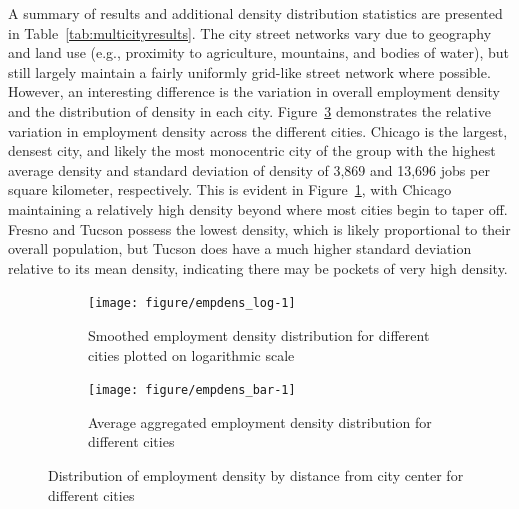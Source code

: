 \documentclass{elsarticle}\usepackage[]{graphicx}\usepackage[]{color}
\newenvironment{knitrout}{}{} %
\begin{document}
\pagebreak

A summary of results and additional density distribution statistics are presented in Table~\ref{tab:multicityresults}. The city street networks vary due to geography and land use (e.g., proximity to agriculture, mountains, and bodies of water), but still largely maintain a fairly uniformly grid-like street network where possible. However, an interesting difference is the variation in overall employment density and the distribution of density in each city. Figure~\ref{fig:empdens} demonstrates the relative variation in employment density across the different cities. Chicago is the largest, densest city, and likely the most monocentric city of the group with the highest average density and standard deviation of density of 3,869 and 13,696 jobs per square kilometer, respectively. This is evident in Figure~\ref{fig:empdens_log}, with Chicago maintaining a relatively high density beyond where most cities begin to taper off. Fresno and Tucson possess the lowest density, which is likely proportional to their overall population, but Tucson does have a much higher standard deviation relative to its mean density, indicating there may be pockets of very high density.

\begin{figure}[H]
     \centering
     \begin{subfigure}[b]{0.49\textwidth}
         \centering
\begin{knitrout}
\color{fgcolor}
\texttt{[image: figure/empdens\_log-1]} 
\end{knitrout}
    \caption{Smoothed employment density distribution for different cities plotted on logarithmic scale}
    \label{fig:empdens_log}
     \end{subfigure}
     \hfill
     \begin{subfigure}[b]{0.49\textwidth}
         \centering
\begin{knitrout}
\color{fgcolor}
\texttt{[image: figure/empdens\_bar-1]} 
\end{knitrout}
    \caption{Average aggregated employment density distribution for different cities}
    \label{fig:empdens_bar}
     \end{subfigure}
	\caption{Distribution of employment density by distance from city center for different cities}
    \label{fig:empdens}
\end{figure}
\end{document}
